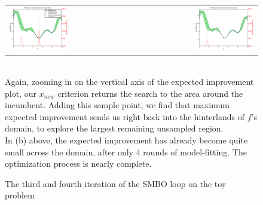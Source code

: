 \begin{figure}[h]
\centering
\begin{tabular}{lr}
\subcaptionbox{}
{\includegraphics[width=0.5\textwidth]{images/ego_ex/3}} &

\subcaptionbox{}
{\includegraphics[width=0.5\textwidth]{images/ego_ex/4}} \\
\end{tabular}
\caption{The third and fourth iteration of the SMBO loop on the toy problem\\}
\label{fig:explore_exploit}

\begin{minipage}{\textwidth}

\ \\Again, zooming in on the vertical axis of the expected improvement plot, our $x_{new}$ criterion returns the search to the area around the incumbent. Adding this sample point, we find that maximum expected improvement sends us right back into the hinterlands of $f$'s domain, to explore the largest remaining unsampled region.\\

In (b) above, the expected improvement has already become quite small across the domain, after only 4 rounds of model-fitting. The optimization process is nearly complete.

\end{minipage}

\end{figure}




